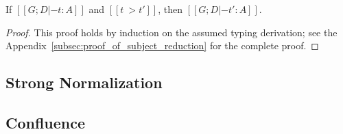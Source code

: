 \begin{lemma}
  \label{lemma:subject_reduction}
  If $[[G;D |- t : A]]$ and $[[t ~> t']]$, then $[[G;D |- t' : A]]$.
\end{lemma}
\begin{proof}
  This proof holds by induction on the assumed typing derivation; see
  the Appendix~\ref{subsec:proof_of_subject_reduction} for the
  complete proof.
\end{proof}

\subsection{Strong Normalization}
\label{subsec:strong_normalization}


\subsection{Confluence}
\label{subsec:confluence}

